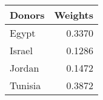 \begin{tabular}{lr}
\toprule
 Donors &  Weights \\
\midrule
  Egypt &   0.3370 \\
 Israel &   0.1286 \\
 Jordan &   0.1472 \\
Tunisia &   0.3872 \\
\bottomrule
\end{tabular}
